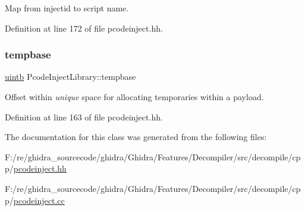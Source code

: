 Map from injectid to script name. 



Definition at line 172 of file pcodeinject.\+hh.

\mbox{\label{class_pcode_inject_library_a52091b5829f5085157ec948cd1eef60c}} 
\subsubsection{\texorpdfstring{tempbase}{tempbase}}
{\footnotesize\ttfamily \mbox{\hyperlink{types_8h_a2db313c5d32a12b01d26ac9b3bca178f}{uintb}} Pcode\+Inject\+Library\+::tempbase\hspace{0.3cm}{\ttfamily [protected]}}



Offset within {\itshape unique} space for allocating temporaries within a payload. 



Definition at line 163 of file pcodeinject.\+hh.



The documentation for this class was generated from the following files\+:\begin{DoxyCompactItemize}
\item 
F\+:/re/ghidra\+\_\+sourcecode/ghidra/\+Ghidra/\+Features/\+Decompiler/src/decompile/cpp/\mbox{\hyperlink{pcodeinject_8hh}{pcodeinject.\+hh}}\item 
F\+:/re/ghidra\+\_\+sourcecode/ghidra/\+Ghidra/\+Features/\+Decompiler/src/decompile/cpp/\mbox{\hyperlink{pcodeinject_8cc}{pcodeinject.\+cc}}\end{DoxyCompactItemize}
